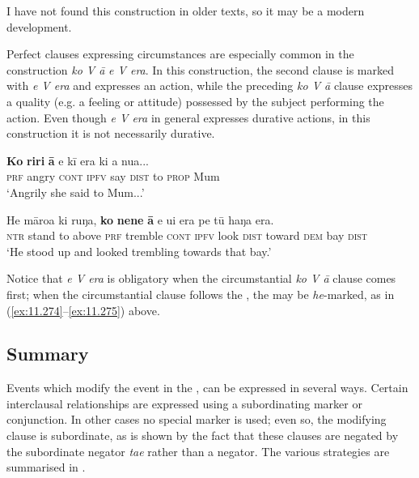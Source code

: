 I have not found this construction in older texts, so it may be a modern development.

Perfect  clauses expressing circumstances are especially common in the construction \textit{ko V {\ꞌ}ā} \textit{e V era}. In this construction, the second clause is marked with \textit{e V era} and expresses an action, while the preceding \textit{ko V {\ꞌ}ā} clause expresses a quality (e.g. a feeling or attitude) possessed by the subject performing the action. Even though \textit{e V era} in general expresses durative actions, in this construction it is not necessarily durative. 

\ea\label{ex:11.276}
\gll \textbf{Ko} \textbf{riri} \textbf{{\ꞌ}ā} e kī era ki a nua... \\
\textsc{prf} angry \textsc{cont} \textsc{ipfv} say \textsc{dist} to \textsc{prop} Mum \\

\glt 
‘Angrily she said to Mum...’ \textstyleExampleref{[R210.062]} 
\z

\ea\label{ex:11.277}
\gll He māroa ki ruŋa, \textbf{ko} \textbf{nene} \textbf{{\ꞌ}ā} e u{\ꞌ}i era pe tū haŋa era. \\
\textsc{ntr} stand to above \textsc{prf} tremble \textsc{cont} \textsc{ipfv} look \textsc{dist} toward \textsc{dem} bay \textsc{dist} \\

\glt
‘He stood up and looked trembling towards that bay.’ \textstyleExampleref{[R408.128]} 
\z

Notice that \textit{e V era} is obligatory when the circumstantial \textit{ko V {\ꞌ}ā} clause comes first; when the circumstantial clause follows the , the  may be \textit{he}{}-marked, as in (\ref{ex:11.274}–\ref{ex:11.275}) above.

\subsection{Summary}\label{sec:11.6.9}

Events which modify the event in the , can be expressed in several ways. Certain interclausal relationships are expressed using a subordinating marker or conjunction. In other cases no special marker is used; even so, the modifying clause is subordinate, as is shown by the fact that these clauses are negated by the subordinate negator \textit{ta{\ꞌ}e} rather than a  negator. The various strategies are summarised in .

